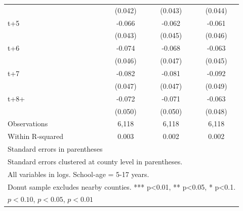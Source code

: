 \begin{table}[htbp]
\begin{tabular}{l*{3}{c}}
            &     (0.042)         &     (0.043)         &     (0.044)         \\
[1em]
t+5         &      -0.066         &      -0.062         &      -0.061         \\
            &     (0.043)         &     (0.045)         &     (0.046)         \\
[1em]
t+6         &      -0.074         &      -0.068         &      -0.063         \\
            &     (0.046)         &     (0.047)         &     (0.045)         \\
[1em]
t+7         &      -0.082\sym{*}  &      -0.081\sym{*}  &      -0.092\sym{*}  \\
            &     (0.047)         &     (0.047)         &     (0.049)         \\
[1em]
t+8+        &      -0.072         &      -0.071         &      -0.063         \\
            &     (0.050)         &     (0.050)         &     (0.048)         \\
\hline
Observations&       6,118         &       6,118         &       6,118         \\
Within R-squared&       0.003         &       0.002         &       0.002         \\
\hline\hline
\multicolumn{4}{l}{\footnotesize Standard errors in parentheses}\\
\multicolumn{4}{l}{\footnotesize Standard errors clustered at county level in parentheses.}\\
\multicolumn{4}{l}{\footnotesize All variables in logs. School-age = 5-17 years.}\\
\multicolumn{4}{l}{\footnotesize Donut sample excludes nearby counties. *** p<0.01, ** p<0.05, * p<0.1.}\\
\multicolumn{4}{l}{\footnotesize \sym{*} \(p<0.10\), \sym{**} \(p<0.05\), \sym{***} \(p<0.01\)}\\
\end{tabular}
\end{table}

